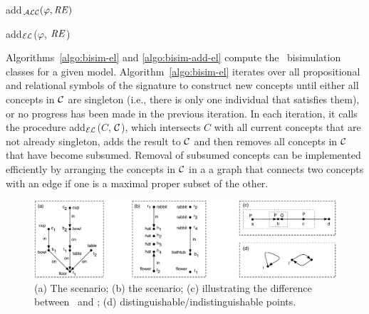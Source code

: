 \begin{algorithm}
\caption{add$_\mathcal{ALC}(\varphi,\mathit{RE})$}
\end{algorithm}


\begin{algorithm}[t]
\dontprintsemicolon
\caption{add$_\mathcal{EL}$($\varphi$, $\mathit{RE}$)}
\label{algo:bisim-add-el}
\end{algorithm}

Algorithms~\ref{algo:bisim-el} and \ref{algo:bisim-add-el} compute
the \el\ bisimulation classes for a given model.
Algorithm~\ref{algo:bisim-el} iterates over all propositional and
relational symbols of the signature to construct new concepts until
either all concepts in $\mathcal{C}$ are singleton (i.e., there is only one
individual that satisfies them), or no progress has been made in the
previous iteration.  In each iteration, it calls the procedure
add$_\mathcal{EL}$($C$, $\mathcal{C}$), which intersects $C$ with all current concepts
that are not already singleton, adds the result to $\mathcal{C}$ and then
removes all concepts in $\mathcal{C}$ that have become subsumed.  Removal of
subsumed concepts can be implemented efficiently by arranging the
concepts in $\mathcal{C}$ in a a graph that connects two concepts with an edge
if one is a maximal proper subset of the other.

\begin{figure}
  \centering
  \includegraphics[width=\textwidth]{pic-dale-haddock}
  \caption{(a) The 
    scenario; (b) the  scenario; (c) illustrating
    the difference between \el\ and \alc; (d)
    distinguishable/indistinguishable points.}
  \label{fig:dale-haddock}
\end{figure}


